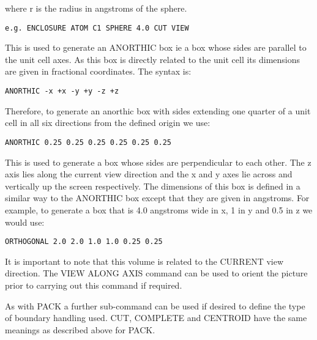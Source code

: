 \documentclass[10pt,a4paper]{report}
\begin{document}
where r is the radius in angstroms of the sphere.
\small\begin{verbatim}
e.g. ENCLOSURE ATOM C1 SPHERE 4.0 CUT VIEW
\end{verbatim}\normalsize




\bigskip{}


This is used to generate an ANORTHIC box ie a box whose sides are parallel to the unit cell axes. As this box is directly related
to the
unit cell its dimensions are given in fractional coordinates. The
syntax
is:
\small\begin{verbatim}
ANORTHIC -x +x -y +y -z +z
\end{verbatim}\normalsize


Therefore, to generate an anorthic box with sides extending one
quarter of a unit
cell in all six directions from the defined origin we use:
\small\begin{verbatim}
ANORTHIC 0.25 0.25 0.25 0.25 0.25 0.25
\end{verbatim}\normalsize




\bigskip{}


This is used to generate a box whose sides are perpendicular to
each
other. The z axis lies along the current view direction and the
x and y
axes lie across and vertically up the screen respectively. The
dimensions of this box is defined in a similar way to the
ANORTHIC box
except that they are given in angstroms. For example, to
generate a box that is 4.0 angstroms wide in x, 1 in y and 0.5
in z we
would use:
\small\begin{verbatim}
ORTHOGONAL 2.0 2.0 1.0 1.0 0.25 0.25
\end{verbatim}\normalsize


It is important to note that this volume is related to the
CURRENT view
direction. The VIEW ALONG AXIS command can be used to orient the
picture
prior to carrying out this command if required.


\bigskip{}


\bigskip{}


\bigskip{}
As with PACK a further sub-command can be used if desired to
define the
type of boundary handling used. CUT, COMPLETE and CENTROID have
the same
meanings as described above for PACK.


\bigskip{}


\bigskip{}
\end{document}
